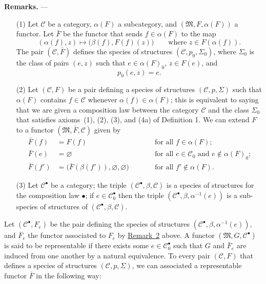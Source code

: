 \documentclass[a4paper,oneside,nobib,nofonts,notitlepage,notoc,nols,fleqn,justified]{tufte-book}
\newenvironment{rmenv}[1]
  {\phantomsection\par\medskip\noindent\textbf{#1.}\rmfamily}
  {\par\medskip}
\newcommand{\oldpage}[1]{{\reversemarginpar\marginnote{\raggedleft\footnotesize\textit{p.~#1}}}}
\newcommand{\CC}{\mathcal{C}}
\newcommand{\MM}{\mathfrak{M}}
\begin{document}
\begin{rmenv}{Remarks}
  ---
  \begin{enumerate}
    \item[\normalfont(1)]
    \label{remark:1}
      Let $\CC$ be a category, $\alpha(F)$ a subcategory, and $(\MM,F,\alpha(F))$ a functor.
      Let $\bar{F}$ be the functor that sends $f\in\alpha(F)$ to the map
      \[
        (\alpha(f),z)
        \longmapsto\big(\beta(f),F(f)(z)\big)
        \qquad\text{where $z\in F(\alpha(f))$.}
      \]
      The pair $(\CC,\bar{F})$ defines the species of structures $(\CC,p_0,\Sigma_0)$, where $\Sigma_0$ is the class of pairs $(e,z)$ such that $e\in\alpha(F)_0$, $z\in F(e)$, and
      \[
        p_0(e,z)=e.
      \]
    \item[\normalfont(2)]
    \label{remark:2}
      Let $(\CC,F)$ be a pair defining a species of structures $(\CC,p,\Sigma)$ such that $\alpha(F)$ contains $f\in\CC$ whenever $\alpha(f)\in\alpha(F)$;
      this is equivalent to saying that we are given a composition law between the category $\CC$ and the class $\Sigma_0$ that satisfies axioms~(1), (2), (3), and (4a) of Definition 1.
      We can extend $F$ to a functor $(\MM,\bar{F},\CC)$ given by
      \[
        \begin{aligned}
          \bar{F}(f)&=F(f)
          \qquad&&\text{for all $f\in\alpha(F)$;}
        \\\bar{F}(e)&=\varnothing
          \qquad&&\text{for all $e\in\CC_0$ and $e\not\in\alpha(F)_0$;}
        \\\bar{F}(f')&=\big(\bar{F}(\beta(f')),\varnothing,\varnothing)
          \qquad&&\text{for all $f'\not\in\alpha(F)$.}
        \end{aligned}
      \]
    \item[\normalfont(3)]
    \label{remark:3}
      Let $\CC^\bullet$ be a category;
      the triple $(\CC^\bullet,\beta,\CC)$ is a species of structures for the composition law $\bullet$;
      if $e\in\CC_0^\bullet$ then the triple $(\CC^\bullet,\beta,\alpha^{-1}(e))$ is a sub-species of structures \cite{3a} of $(\CC^\bullet,\beta,\CC)$.
  \end{enumerate}
\end{rmenv}

\oldpage{354}
Let $(\CC^\bullet,F_e)$ be the pair defining the species of structures $(\CC^\bullet,\beta,\alpha^{-1}(e))$, and $\bar{F}_e$ the functor associated to $F_e$ by \hyperref[remark:2]{Remark~2} above.
A functor $(\MM,G,\CC^\bullet)$ is said to be representable \cite{2} if there exists some $e\in\CC_0^\bullet$ such that $G$ and $\bar{F}_e$ are induced from one another by a natural equivalence.
To every pair $(\CC,F)$ that defines a species of structures $(\CC,p,\Sigma)$, we can associated a representable functor $\bar{F}$ in the following way:
\end{document}
